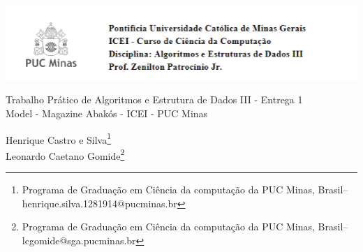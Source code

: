 \documentclass[a4paper,12pt,Times]{article}
\makeatletter
\newcommand{\monog}{Trabalho Prático de Algoritmos e Estrutura de Dados III - Entrega 1}
\newcommand{\monogES}{Model - Magazine Abakós - ICEI - PUC Minas}
\newcommand{\origem}{Brasil}
\newcommand{\AutorA}{Henrique Castro e Silva}
\newcommand{\funcaoA}{}
\newcommand{\emailA}{henrique.silva.1281914@pucminas.br}
\newcommand{\cursA}{Programa de Graduação em Ciência da computação da PUC Minas}
\newcommand{\AutorB}{Leonardo Caetano Gomide}
\newcommand{\funcaoB}{}
\newcommand{\emailB}{lcgomide@sga.pucminas.br}
\newcommand{\cursB}{Programa de Graduação em Ciência da computação da PUC Minas}
\makeatother
\begin{document}

\begin{flushleft}

\begin{minipage} [c][3cm][b]{15cm} %
\begin{flushleft}
\includegraphics[scale=1.5]{figuras/header.png} 
\end{flushleft}
\end{minipage}

 \vspace{0cm} {
 \singlespacing \Large{\monog \\ }
  \normalsize{\monogES}
 }
\end{flushleft}
\begin{flushright}
\singlespacing 
\normalsize{\AutorA \footnote{\funcaoA \cursA, \origem -- \emailA }} \\
\normalsize{\AutorB \footnote{\funcaoB \cursB, \origem -- \emailB }} \\
\end{flushright}
\thispagestyle{empty}
\end{document}
